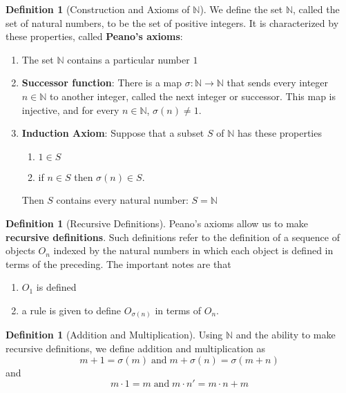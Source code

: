 \documentclass[12pt]{article}
\theoremstyle{definition}
\newtheorem{defn}[thm]{Definition}
\theoremstyle{remark}
\numberwithin{equation}{section}
\newcommand\N{\mathbb N}    %
\newcommand\B[1]{\textbf{ #1}}
\begin{document}
\begin{defn}[Construction and Axioms of $\N$]
        We define the set $\N$, called the set of natural numbers, to be the set of positive integers. It is characterized by these properties, called \B{Peano's axioms}:\begin{enumerate}
                \item The set $\N$ contains a particular number $1$
                \item \B{Successor function}: There is a map $\sigma: \N\rightarrow \N$ that sends every integer $n \in \N$ to another integer, called the next integer or successor. This map is injective, and for every $n \in \N$, $\sigma(n) \neq 1$.
                \item \B{Induction Axiom}: Suppose that a subset $S$ of $\N$ has these properties \begin{enumerate}
                                \item $1 \in S$
                                \item if $n \in S$ then $\sigma(n) \in S$.
                \end{enumerate}
                        Then $S$ contains every natural number: $S = \N$
        \end{enumerate}
\end{defn}

\vspace{15pt}

\begin{defn}[Recursive Definitions]
        Peano's axioms allow us to make \B{recursive definitions}. Such definitions refer to the definition of a sequence of objects $O_n$ indexed by the natural numbers in which each object is defined in terms of the preceding. The important notes are that \begin{enumerate}
                \item $O_1$ is defined
                \item a rule is given to define $O_{\sigma(n)}$ in terms of $O_n$.
        \end{enumerate}
\end{defn}

\vspace{15pt}

\begin{defn}[Addition and Multiplication]
        Using $\N$ and the ability to make recursive definitions, we define addition and multiplication as \begin{equation}
                m+1 = \sigma(m)\;\text{and}\;m+\sigma(n) = \sigma(m+n)
        \end{equation}
        and \begin{equation}
                m\cdot 1 = m\;\text{and}\;m\cdot n' = m \cdot n + m
        \end{equation}
\end{defn}
\end{document}
